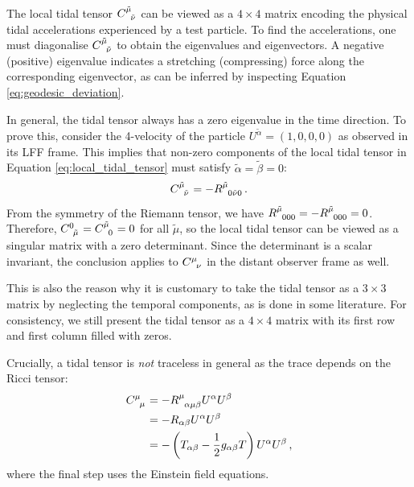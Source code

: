 \documentclass[
    reprint,
    prd,
    nofootinbib,
    amsmath,amssymb,
    aps,
    floatfix,
]{revtex4-2}
\begin{document}
The local tidal tensor $\tensor{C}{^{\tilde{\mu}}_{\tilde{\nu}}}$ can be viewed as a $4 \times 4$ matrix encoding the physical tidal accelerations experienced by a test particle. To find the accelerations, one must diagonalise $\tensor{C}{^{\tilde{\mu}}_{\tilde{\nu}}}$ to obtain the eigenvalues and eigenvectors. A negative (positive) eigenvalue indicates a stretching (compressing) force along the corresponding eigenvector, as can be inferred by inspecting Equation \ref{eq:geodesic_deviation}.

In general, the tidal tensor always has a zero eigenvalue in the time direction. To prove this, consider the 4-velocity of the particle $U^{\tilde{\alpha}} = (1, 0, 0, 0)$ as observed in its LFF frame. This implies that non-zero components of the local tidal tensor in Equation \ref{eq:local_tidal_tensor} must satisfy $\tilde{\alpha} = \tilde{\beta} = 0$:
\begin{equation}
    \tensor{C}{^{\tilde{\mu}}_{\tilde{\nu}}} = -\tensor{R}{^{\tilde{\mu}}_{0\tilde{\nu}0}} \, .
\end{equation}
From the symmetry of the Riemann tensor, we have $\tensor{R}{^{\tilde{\mu}}_{000}} = -\tensor{R}{^{\tilde{\mu}}_{000}} = 0$. Therefore, $\tensor{C}{^{0}_{\tilde{\mu}}} = \tensor{C}{^{\tilde{\mu}}_{0}} = 0$ for all $\tilde{\mu}$, so the local tidal tensor can be viewed as a singular matrix with a zero determinant. Since the determinant is a scalar invariant, the conclusion applies to $\tensor{C}{^{\mu}_{\nu}}$ in the distant observer frame as well.

This is also the reason why it is customary to take the tidal tensor as a $3 \times 3$ matrix by neglecting the temporal components, as is done in some literature. For consistency, we still present the tidal tensor as a $4 \times 4$ matrix with its first row and first column filled with zeros.

Crucially, a tidal tensor is \textit{not} traceless in general as the trace depends on the Ricci tensor:
\begin{equation}
    \begin{split}
        \tensor{C}{^{\mu}_{\mu}} &= -\tensor{R}{^{\mu}_{\alpha \mu \beta}} U^{\alpha} U^{\beta} \\
        &= -R_{\alpha \beta} U^{\alpha} U^{\beta} \\
        &= -\left( T_{\alpha \beta} - \frac{1}{2} g_{\alpha \beta} T \right) U^{\alpha} U^{\beta} \, ,
    \end{split}
\end{equation}
where the final step uses the Einstein field equations.
\end{document}
